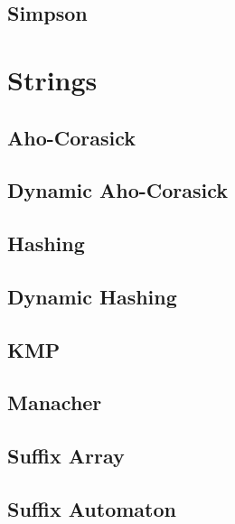 \subsection{Simpson}
\raggedbottom
\hrulefill
\newpage

\section{Strings}
\subsection{Aho-Corasick}
\raggedbottom
\hrulefill
\subsection{Dynamic Aho-Corasick}
\raggedbottom
\hrulefill
\subsection{Hashing}
\raggedbottom
\hrulefill
\subsection{Dynamic Hashing}
\raggedbottom
\hrulefill
\subsection{KMP}
\raggedbottom
\hrulefill
\subsection{Manacher}
\raggedbottom
\hrulefill
\subsection{Suffix Array}
\raggedbottom
\hrulefill
\subsection{Suffix Automaton}
\raggedbottom
\hrulefill
